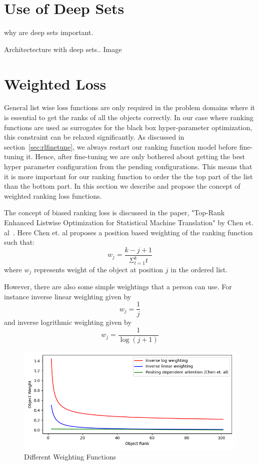 \documentclass[11pt]{report}
\begin{document}
\section{Use of Deep Sets}
why are deep sets important. 

Architectecture with deep sets.. Image


\section{Weighted Loss}
General list wise loss functions are only required in the problem domains where it is essential to get the ranks of all the objects correctly.
In our case where ranking functions are used as surrogates for the black box hyper-parameter optimization,
this constraint can be relaxed significantly.
As discussed in section~\ref{sec:rlfinetune},  we always restart our ranking function model before
fine-tuning it.
Hence,  after fine-tuning we are only bothered about getting the best hyper parameter configuration from the pending configurations.
This means that it is more important for our ranking function to order the the top part of the list than the bottom part.
In this section we describe and propose the concept of weighted ranking loss functions.

The concept of biased ranking loss is discussed in the paper, "Top-Rank Enhanced Listwise Optimization for Statistical Machine Translation" by  Chen et. al~\cite{TRLWO}.
Here Chen et. al proposes a position based weighting of the ranking function such that:
\begin{equation}
w_j = \frac{k - j + 1}{\Sigma_{t=1}^k t}
\end{equation}
where $w_j$ represents weight of the object at position $j$ in the ordered list.

However, there are also some simple weightings that a person can use.  For instance inverse linear weighting given by
\begin{equation}
w_j = \frac{1}{j}
\end{equation}
and inverse logrithmic weighting given by
\begin{equation}
w_j = \frac{1}{\log (j+1)}
\end{equation}

\begin{figure}[htb]
  \centering
    \includegraphics[scale=0.75]{images/weightingfunctions}
    \caption{Different Weighting Functions}
    \label{fig:weightingfunctions}
\end{figure}
\end{document}
